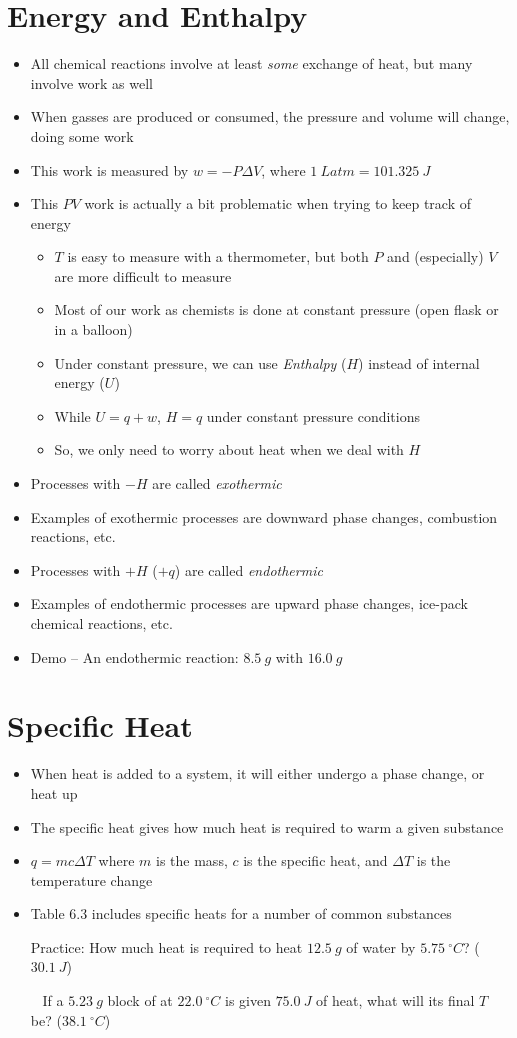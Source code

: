 \documentclass[12pt, openany, letterpaper]{memoir}
\begin{document}
\section{Energy and Enthalpy}
\begin{itemize}
	\item All chemical reactions involve at least \emph{some} exchange of heat, but many involve work as well
	\item When gasses are produced or consumed, the pressure and volume will change, doing some work
	\item This work is measured by $w=-P\Delta V$, where $1~Latm=101.325~J$
	\item This $PV$ work is actually a bit problematic when trying to keep track of energy
	\begin{itemize}
		\item $T$ is easy to measure with a thermometer, but both $P$ and (especially) $V$ are more difficult to measure
		\item Most of our work as chemists is done at constant pressure (open flask or in a balloon)
		\item Under constant pressure, we can use \emph{Enthalpy} ($H$) instead of internal energy ($U$)
		\item While $U=q+w$, $H=q$ under constant pressure conditions
		\item So, we only need to worry about heat when we deal with $H$
	\end{itemize}
	\item Processes with $-H$ are called \emph{exothermic}
	\item Examples of exothermic processes are downward phase changes, combustion reactions, etc.
	\item Processes with $+H$ ($+q$) are called \emph{endothermic}
	\item Examples of endothermic processes are upward phase changes, ice-pack chemical reactions, etc.	
	\item Demo -- An endothermic reaction: $8.5~g$  with $16.0~g$ 
\end{itemize}
\section{Specific Heat}
\begin{itemize}
	\item When heat is added to a system, it will either undergo a phase change, or heat up
	\item The specific heat gives how much heat is required to warm a given substance
	\item $q=mc\Delta T$ \hspace{2em} where $m$ is the mass, $c$ is the specific heat, and $\Delta T$ is the temperature change
	\item Table 6.3 includes specific heats for a number of common substances
	
	Practice: How much heat is required to heat $12.5~g$ of water by $5.75~^\circ C$? ($30.1~J$)
	
	~\hphantom{Practice:} If a $5.23~g$ block of  at $22.0~^\circ C$ is given $75.0~J$ of heat, what will its final $T$ be? ($38.1~^\circ C$) 
\end{itemize}
\end{document}
